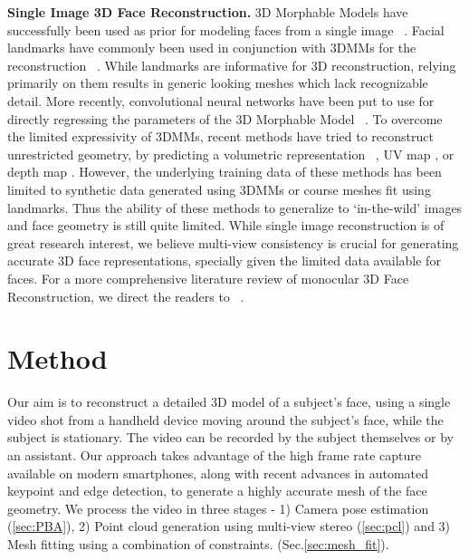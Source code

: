 \documentclass[10pt,twocolumn,letterpaper]{article}
\begin{document}
\noindent \textbf{Single Image 3D Face Reconstruction.} 3D Morphable Models have successfully been used as prior for modeling faces from a single image ~\cite{blanz1999morphable, breuer2008automatic, zhu2015high, saito2017photorealistic, jiang20183d, richardson20163d, tuan2017regressing}. Facial landmarks have commonly been used in conjunction with 3DMMs for the reconstruction ~\cite{zhu2015high, aldrian2010linear, kemelmacher20113d, dou2014robust}. While landmarks are informative for 3D reconstruction, relying primarily on them results in generic looking meshes which lack recognizable detail. More recently, convolutional neural networks have been put to use for directly regressing the parameters of the 3D Morphable Model ~\cite{zhu2016face, jourabloo2016large}. To overcome the limited expressivity of 3DMMs, recent methods have tried to reconstruct unrestricted geometry, by predicting  a volumetric representation ~\cite{jackson2017large}, UV map \cite{feng2018joint}, or depth map \cite{sela2017unrestricted}. However, the underlying training data of these methods has been limited to synthetic data generated using 3DMMs or course meshes fit using landmarks. Thus the ability of these methods to generalize to `in-the-wild' images and face geometry is still quite limited. While single image reconstruction is of great research interest, we believe multi-view consistency is crucial for generating accurate 3D face representations, specially given the limited data available for faces.  For a more comprehensive literature review of monocular 3D Face Reconstruction, we direct the readers to ~\cite{zollhofer2018state}.




\section{Method}
Our aim is to reconstruct a detailed 3D model of a subject's face, using a single video shot from a handheld device moving around the subject's face, while the subject is stationary. The video can be recorded by the subject themselves or by an assistant. 
Our approach takes advantage of the high frame rate capture available on modern smartphones, along with recent advances in automated keypoint and edge detection, to generate a highly accurate mesh of the face geometry. 
We process the video in three stages -  1) Camera pose estimation (\ref{sec:PBA}), 2) Point cloud generation using multi-view stereo (\ref{sec:pcl}) and 3) Mesh fitting using a combination of constraints. (Sec.\ref{sec:mesh_fit}). 
\end{document}
